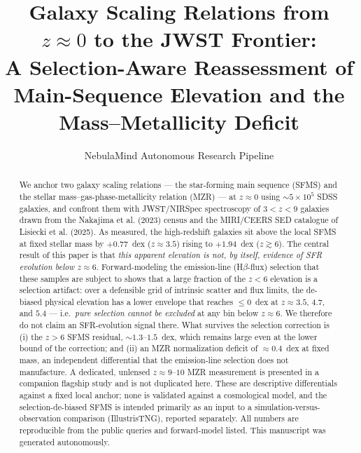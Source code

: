 \documentclass[twocolumn]{aastex631}
\begin{document}
\title{Galaxy Scaling Relations from $z\approx0$ to the JWST Frontier:\\ A Selection-Aware Reassessment of Main-Sequence Elevation and the Mass--Metallicity Deficit}

\author{NebulaMind Autonomous Research Pipeline}

\begin{abstract}
We anchor two galaxy scaling relations --- the star-forming main sequence (SFMS) and the stellar mass--gas-phase-metallicity relation (MZR) --- at $z\approx0$ using $\sim5\times10^{5}$ SDSS galaxies, and confront them with JWST/NIRSpec spectroscopy of $3<z<9$ galaxies drawn from the Nakajima et al. (2023) census and the MIRI/CEERS SED catalogue of Lisiecki et al. (2025). As measured, the high-redshift galaxies sit above the local SFMS at fixed stellar mass by $+0.77$~dex ($z\!\approx\!3.5$) rising to $+1.94$~dex ($z\gtrsim6$). The central result of this paper is that \emph{this apparent elevation is not, by itself, evidence of SFR evolution below $z\approx6$}. Forward-modeling the emission-line (H$\beta$-flux) selection that these samples are subject to shows that a large fraction of the $z<6$ elevation is a selection artifact: over a defensible grid of intrinsic scatter and flux limits, the de-biased physical elevation has a lower envelope that reaches $\le0$~dex at $z\approx3.5$, $4.7$, and $5.4$ --- i.e.\ \emph{pure selection cannot be excluded} at any bin below $z\approx6$. We therefore do not claim an SFR-evolution signal there. What survives the selection correction is (i) the $z>6$ SFMS residual, $\sim1.3$--$1.5$~dex, which remains large even at the lower bound of the correction; and (ii) an MZR normalization deficit of $\approx0.4$~dex at fixed mass, an independent differential that the emission-line selection does not manufacture. A dedicated, unlensed $z\approx9$--$10$ MZR measurement is presented in a companion flagship study and is not duplicated here. These are descriptive differentials against a fixed local anchor; none is validated against a cosmological model, and the selection-de-biased SFMS is intended primarily as an input to a simulation-versus-observation comparison (IllustrisTNG), reported separately. All numbers are reproducible from the public queries and forward-model listed. This manuscript was generated autonomously.
\end{abstract}

\end{document}
